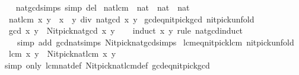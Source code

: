 \begin{isabellebody}
\ \ \isanewline
{}\isamarkupfalse%
\ nat{\isacharunderscore}{\kern0pt}gcd{\isachardot}{\kern0pt}simps\ {\isacharbrackleft}{\kern0pt}simp\ del{\isacharbrackright}{\kern0pt}\isanewline
\isanewline
{}\isamarkupfalse%
\ nat{\isacharunderscore}{\kern0pt}lcm\ {\isacharcolon}{\kern0pt}{\isacharcolon}{\kern0pt}\ {\isachardoublequoteopen}nat\ {\isasymRightarrow}\ nat\ {\isasymRightarrow}\ nat{\isachardoublequoteclose}\ \isanewline
\ \ {\isachardoublequoteopen}nat{\isacharunderscore}{\kern0pt}lcm\ x\ y\ {\isacharequal}{\kern0pt}\ x\ {\isacharasterisk}{\kern0pt}\ y\ div\ {\isacharparenleft}{\kern0pt}nat{\isacharunderscore}{\kern0pt}gcd\ x\ y{\isacharparenright}{\kern0pt}{\isachardoublequoteclose}\isanewline
\isanewline
{}\isamarkupfalse%
\ gcd{\isacharunderscore}{\kern0pt}eq{\isacharunderscore}{\kern0pt}nitpick{\isacharunderscore}{\kern0pt}gcd\ {\isacharbrackleft}{\kern0pt}nitpick{\isacharunderscore}{\kern0pt}unfold{\isacharbrackright}{\kern0pt}{\isacharcolon}{\kern0pt}\isanewline
\ \ {\isachardoublequoteopen}gcd\ x\ y\ {\isacharequal}{\kern0pt}\ Nitpick{\isachardot}{\kern0pt}nat{\isacharunderscore}{\kern0pt}gcd\ x\ y{\isachardoublequoteclose}\isanewline
%
\isadelimproof
\ \ %
\endisadelimproof
%
\isatagproof
{}\isamarkupfalse%
\ {\isacharparenleft}{\kern0pt}induct\ x\ y\ rule{\isacharcolon}{\kern0pt}\ nat{\isacharunderscore}{\kern0pt}gcd{\isachardot}{\kern0pt}induct{\isacharparenright}{\kern0pt}\isanewline
\ \ \ \ {\isacharparenleft}{\kern0pt}simp\ add{\isacharcolon}{\kern0pt}\ gcd{\isacharunderscore}{\kern0pt}nat{\isachardot}{\kern0pt}simps\ Nitpick{\isachardot}{\kern0pt}nat{\isacharunderscore}{\kern0pt}gcd{\isachardot}{\kern0pt}simps{\isacharparenright}{\kern0pt}%
\endisatagproof
{\isafoldproof}%
%
\isadelimproof
\isanewline
%
\endisadelimproof
\isanewline
{}\isamarkupfalse%
\ lcm{\isacharunderscore}{\kern0pt}eq{\isacharunderscore}{\kern0pt}nitpick{\isacharunderscore}{\kern0pt}lcm\ {\isacharbrackleft}{\kern0pt}nitpick{\isacharunderscore}{\kern0pt}unfold{\isacharbrackright}{\kern0pt}{\isacharcolon}{\kern0pt}\isanewline
\ \ {\isachardoublequoteopen}lcm\ x\ y\ {\isacharequal}{\kern0pt}\ Nitpick{\isachardot}{\kern0pt}nat{\isacharunderscore}{\kern0pt}lcm\ x\ y{\isachardoublequoteclose}\isanewline
%
\isadelimproof
\ \ %
\endisadelimproof
%
\isatagproof
{}\isamarkupfalse%
\ {\isacharparenleft}{\kern0pt}simp\ only{\isacharcolon}{\kern0pt}\ lcm{\isacharunderscore}{\kern0pt}nat{\isacharunderscore}{\kern0pt}def\ Nitpick{\isachardot}{\kern0pt}nat{\isacharunderscore}{\kern0pt}lcm{\isacharunderscore}{\kern0pt}def\ gcd{\isacharunderscore}{\kern0pt}eq{\isacharunderscore}{\kern0pt}nitpick{\isacharunderscore}{\kern0pt}gcd{\isacharparenright}{\kern0pt}%

\end{isabellebody}
